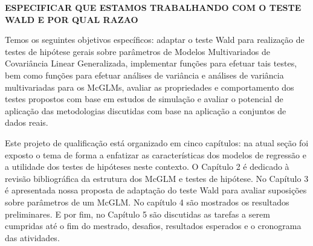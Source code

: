 \textbf{ESPECIFICAR QUE ESTAMOS TRABALHANDO COM O TESTE WALD E POR QUAL RAZAO}

Temos os seguintes objetivos específicos: adaptar o teste Wald para realização de testes de hipótese gerais sobre parâmetros de Modelos Multivariados de Covariância Linear Generalizada, implementar funções para efetuar tais testes, bem como funções para efetuar análises de variância e análises de variância multivariadas para os McGLMs, avaliar as propriedades e comportamento dos testes propostos com base em estudos de simulação e avaliar o potencial de aplicação das metodologias discutidas com base na aplicação a conjuntos de dados reais.

Este projeto de qualificação está organizado em cinco capítulos: na atual seção foi exposto o tema de forma a enfatizar as características dos modelos de regressão e a utilidade dos testes de hipóteses neste contexto. O Capítulo 2 é dedicado à revisão bibliográfica da estrutura dos McGLM e testes de hipótese. No Capítulo 3 é apresentada nossa proposta de adaptação do teste Wald para avaliar suposições sobre parâmetros de um McGLM. No capítulo 4 são mostrados os resultados preliminares. E por fim, no Capítulo 5 são discutidas as tarefas a serem cumpridas até o fim do mestrado, desafios, resultados esperados e o cronograma das atividades.

